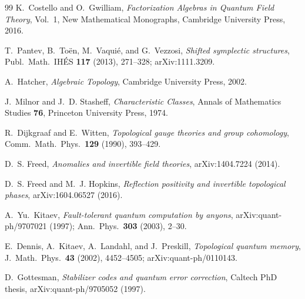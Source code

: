 \documentclass[12pt]{article}
\theoremstyle{definition}
\theoremstyle{remark}
\begin{document}
\begin{thebibliography}{99}
 K.~Costello and O.~Gwilliam, \emph{Factorization
Algebras in Quantum Field Theory}, Vol.~1, New Mathematical Monographs, Cambridge
University Press, 2016.

 T.~Pantev, B.~To\"en, M.~Vaqui\'e, and G.~Vezzosi, \emph{Shifted
symplectic structures}, Publ.\ Math.\ IH\'ES \textbf{117} (2013), 271--328;
arXiv:1111.3209.

 A.~Hatcher, \emph{Algebraic Topology}, Cambridge University
Press, 2002.

 J.~Milnor and J.~D. Stasheff, \emph{Characteristic
Classes}, Annals of Mathematics Studies \textbf{76}, Princeton University Press, 1974.

 R.~Dijkgraaf and E.~Witten, \emph{Topological gauge
theories and group cohomology}, Comm.\ Math.\ Phys.\ \textbf{129} (1990), 393--429.

 D.~S. Freed, \emph{Anomalies and invertible field theories},
arXiv:1404.7224 (2014).

 D.~S. Freed and M.~J. Hopkins, \emph{Reflection positivity
and invertible topological phases}, arXiv:1604.06527 (2016).

 A.~Yu.\ Kitaev, \emph{Fault-tolerant quantum computation by
anyons}, arXiv:quant-ph/9707021 (1997); Ann.\ Phys.\ \textbf{303} (2003), 2--30.

 E.~Dennis, A.~Kitaev, A.~Landahl, and J.~Preskill, \emph{Topological
quantum memory}, J.\ Math.\ Phys.\ \textbf{43} (2002), 4452--4505;
arXiv:quant-ph/0110143.

 D.~Gottesman, \emph{Stabilizer codes and quantum error
correction}, Caltech PhD thesis, arXiv:quant-ph/9705052 (1997).

\end{thebibliography}
\end{document}
